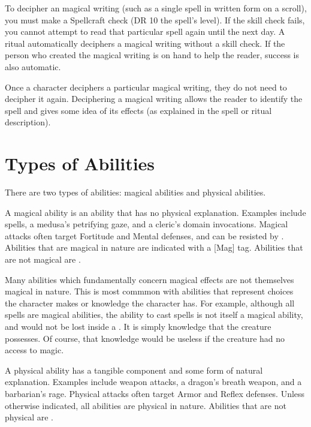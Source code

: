         To decipher an magical writing (such as a single spell in written form on a scroll), you must make a Spellcraft check (DR 10 \add the spell's level). If the skill check fails, you cannot attempt to read that particular spell again until the next day.
        A  ritual automatically deciphers a magical writing without a skill check.
        If the person who created the magical writing is on hand to help the reader, success is also automatic.

        Once a character deciphers a particular magical writing, they do not need to decipher it again.
        Deciphering a magical writing allows the reader to identify the spell and gives some idea of its effects (as explained in the spell or ritual description).

\section{Types of Abilities}

    There are two types of abilities: magical abilities and physical abilities.

    \label{Magical Abilities} A magical ability is an ability that has no physical explanation.
    Examples include spells, a medusa's petrifying gaze, and a cleric's domain invocations.
    Magical attacks often target Fortitude and Mental defenses, and can be resisted by .
    Abilities that are magical in nature are indicated with a [Mag] tag.
    Abilities that are not magical are .

    Many abilities which fundamentally concern magical effects are not themselves magical in nature.
    This is most commmon with abilities that represent choices the character makes or knowledge the character has.
    For example, although all spells are magical abilities, the ability to cast spells is not itself a magical ability, and would not be lost inside a .
    It is simply knowledge that the creature possesses.
    Of course, that knowledge would be useless if the creature had no access to magic.

    \label{Physical Abilities} A physical ability has a tangible component and some form of natural explanation.
    Examples include weapon attacks, a dragon's breath weapon, and a barbarian's rage.
    Physical attacks often target Armor and Reflex defenses.
    Unless otherwise indicated, all abilities are physical in nature.
    Abilities that are not physical are .
